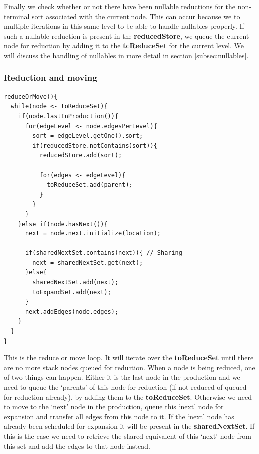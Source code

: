 \documentclass[a4paper,10pt]{article}
\begin{document}
Finally we check whether or not there have been nullable reductions for the non-terminal sort associated with the current node. This can occur because we to multiple iterations in this same level to be able to handle nullables properly. If such a nullable reduction is present in the {\bf reducedStore}, we queue the current node for reduction by adding it to the {\bf toReduceSet} for the current level. We will discuss the handling of nullables in more detail in section \ref{subsec:nullables}.

\pagebreak
\subsubsection{Reduction and moving}
{\small
\begin{verbatim}
reduceOrMove(){
  while(node <- toReduceSet){
    if(node.lastInProduction()){
      for(edgeLevel <- node.edgesPerLevel){
        sort = edgeLevel.getOne().sort;
        if(reducedStore.notContains(sort)){
          reducedStore.add(sort);
          
          for(edges <- edgeLevel){
            toReduceSet.add(parent);
          }
        }
      }
    }else if(node.hasNext()){
      next = node.next.initialize(location);
      
      if(sharedNextSet.contains(next)){ // Sharing
        next = sharedNextSet.get(next);
      }else{
        sharedNextSet.add(next);
        toExpandSet.add(next);
      }
      next.addEdges(node.edges);
    }
  }
}
\end{verbatim}
}

This is the reduce or move loop. It will iterate over the {\bf toReduceSet} until there are no more stack nodes queued for reduction. When a node is being reduced, one of two things can happen. Either it is the last node in the production and we need to queue the `parents' of this node for reduction (if not reduced of queued for reduction already), by adding them to the {\bf toReduceSet}. Otherwise we need to move to the `next' node in the production, queue this `next' node for expansion and transfer all edges from this node to it. If the `next' node has already been scheduled for expansion it will be present in the {\bf sharedNextSet}. If this is the case we need to retrieve the shared equivalent of this `next' node from this set and add the edges to that node instead.
\end{document}
